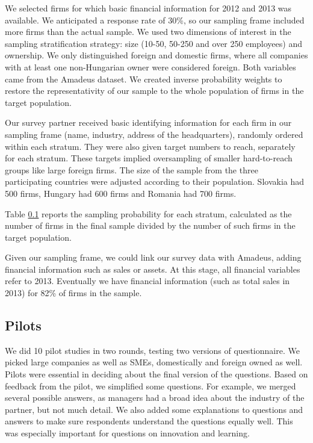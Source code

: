 \documentclass[final, dvipsnames, authoryear,12pt]{elsarticle}
\begin{document}
We selected firms for which basic financial information for 2012 and 2013 was available. We anticipated a response rate of 30\%, so our sampling frame included more firms than the actual sample. We used two dimensions of interest in the sampling stratification strategy: size (10-50, 50-250 and over 250 employees) and ownership. We only distinguished foreign and domestic firms, where all companies with at least one non-Hungarian owner were considered  foreign. Both variables came from the Amadeus dataset. We created inverse probability weights to restore the representativity of our sample to the whole population of firms in the target population.

Our survey partner received basic identifying information for each firm in our sampling frame (name, industry, address of the headquarters), randomly ordered within each stratum. They were also given target numbers to reach, separately for each stratum. These targets implied oversampling of smaller hard-to-reach groups like large foreign firms. The size of the sample from the three participating countries were adjusted according to their population. Slovakia had 500 firms, Hungary had 600 firms and Romania had 700 firms.

Table \ref{} reports the sampling probability for each stratum, calculated as the number of firms in the final sample divided by the number of such firms in the target population.


Given our sampling frame, we could link our survey data with Amadeus, adding financial information such as sales or assets. At this stage, all financial variables refer to 2013. Eventually we have financial information (such as total sales in 2013) for 82\% of firms in the sample. 

\subsection{Pilots}
We did 10 pilot studies in two rounds, testing two versions of questionnaire. We picked large companies as well as SMEs, domestically and foreign owned as well. Pilots were essential in deciding about the final version of the questions. Based on feedback from the pilot, we simplified some questions. For example, we merged several possible answers, as managers had a broad idea about the industry of the partner, but not much detail. We also added some explanations to questions and answers to make sure respondents understand the questions equally well. This was especially important for questions on innovation and learning. 
\end{document}
